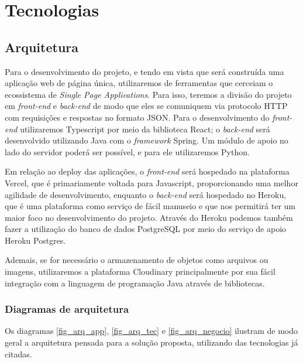 \chapter{Tecnologias}
\section{Arquitetura}
Para o desenvolvimento do projeto, e tendo em vista que será construída uma aplicação web de página única, utilizaremos de ferramentas que cerceiam o ecossistema de \textit{Single Page Applications}. Para isso, teremos a divisão do projeto em \textit{front-end} e \textit{back-end} de modo que eles se comuniquem via protocolo HTTP com requisições e respostas no formato JSON. Para o desenvolvimento do \textit{front-end} utilizaremos Typescript por meio da biblioteca React; o \textit{back-end} será desenvolvido utilizando Java com o \textit{framework} Spring. Um módulo de apoio no lado do servidor poderá ser possível, e para ele utilizaremos Python. 

Em relação ao deploy das aplicações, o \textit{front-end} será hospedado na plataforma Vercel, que é primariamente voltada para Javascript, proporcionando uma melhor agilidade de desenvolvimento, enquanto o \textit{back-end} será hospedado no Heroku, que é uma plataforma como serviço de fácil manuseio e que nos permitirá ter um maior foco no desenvolvimento do projeto. Através do Heroku podemos também fazer a utilização do banco de dados PostgreSQL por meio do serviço de apoio Heroku Postgres.

Ademais, se for necessário o armazenamento de objetos como arquivos ou imagens, utilizaremos a plataforma Cloudinary principalmente por sua fácil integração com a linguagem de programação Java através de bibliotecas.

%
\subsection{Diagramas de arquitetura}
Os diagramas \autoref{fig_arq_app}, \autoref{fig_arq_tec} e \autoref{fig_arq_negocio} ilustram de modo geral a arquitetura pensada para a solução proposta, utilizando das tecnologias já citadas.

